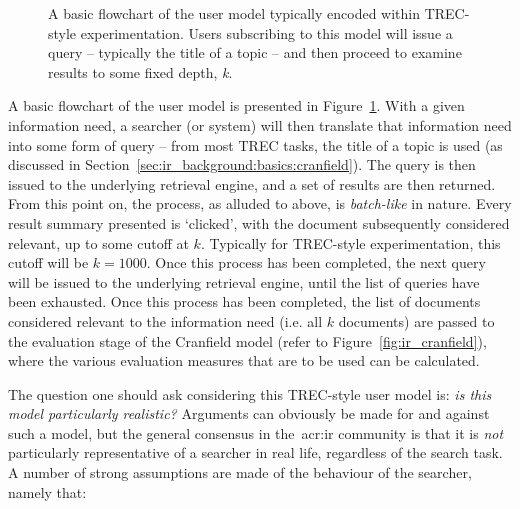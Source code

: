 \begin{figure}[t!]
    \centering
    \caption[The TREC-style user model]{A basic flowchart of the user model typically encoded within TREC-style experimentation. Users subscribing to this model will issue a query – typically the title of a topic – and then proceed to examine results to some fixed depth, \emph{k}.}
    \label{fig:trec_model}
\end{figure}

A basic flowchart of the user model is presented in Figure~\ref{fig:trec_model}. With a given information need, a searcher (or system) will then translate that information need into some form of query -- from most TREC tasks, the title of a topic is used (as discussed in Section~\ref{sec:ir_background:basics:cranfield}). The query is then issued to the underlying retrieval engine, and a set of results are then returned. From this point on, the process, as alluded to above, is \emph{batch-like} in nature. Every result summary presented is `clicked', with the document subsequently considered relevant, up to some cutoff at $k$. Typically for TREC-style experimentation, this cutoff will be $k=1000$. Once this process has been completed, the next query will be issued to the underlying retrieval engine, until the list of queries have been exhausted. Once this process has been completed, the list of documents considered relevant to the information need (i.e. all $k$ documents) are passed to the evaluation stage of the Cranfield model (refer to Figure~\ref{fig:ir_cranfield}), where the various evaluation measures that are to be used can be calculated.

The question one should ask considering this TREC-style user model is: \emph{is this model particularly realistic?} Arguments can obviously be made for and against such a model, but the general consensus in the~\gls{acr:ir} community is that it is \emph{not} particularly representative of a searcher in real life, regardless of the search task. A number of strong assumptions are made of the behaviour of the searcher, namely that:


